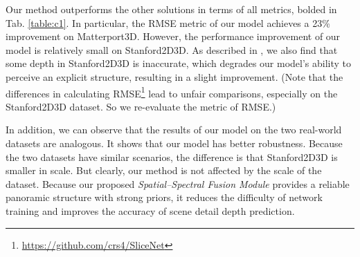 \documentclass[10pt,times,mathptm,psfig,twocolumn,journals]{IEEEtran}
\begin{document}
Our method outperforms the other solutions in terms of all metrics, bolded in Tab. \ref{table:c1}. In particular, the RMSE metric of our model achieves a 23\% improvement on Matterport3D. However, the performance improvement of our model is relatively small on Stanford2D3D. As described in \cite{Jiang_2021}, we also find that some depth in Stanford2D3D is inaccurate, which degrades our model's ability to perceive an explicit structure, resulting in a slight improvement. (Note that the differences in calculating RMSE\footnote{\url{https://github.com/crs4/SliceNet}} lead to unfair comparisons, especially on the Stanford2D3D dataset. So we re-evaluate the metric of RMSE.)

 In addition, we can observe that the results of our model on the two real-world datasets are analogous. It shows that our model has better robustness. Because the two datasets have similar scenarios, the difference is that Stanford2D3D is smaller in scale. But clearly, our method is not affected by the scale of the dataset. Because our proposed \textit{Spatial–Spectral Fusion Module} provides a reliable panoramic structure with strong priors, it reduces the difficulty of network training and improves the accuracy of scene detail depth prediction.
\end{document}
